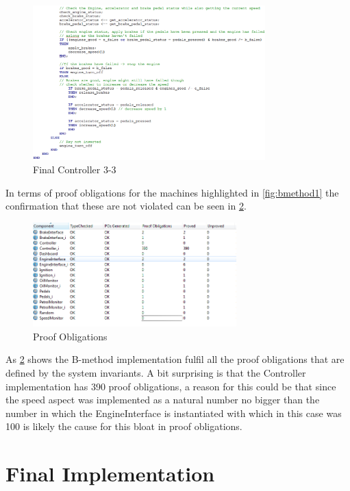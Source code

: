 \documentclass[12pt]{article}
\begin{document}
\begin{figure}[H]
	\centering
	\includegraphics[width=0.8\textwidth]{new_controller_v3}
	\caption{Final Controller 3-3}
	\label{fig:bmethod12}
\end{figure}

In terms of proof obligations for the machines highlighted in \ref{fig:bmethod1} the confirmation that these are not violated can be seen in \ref{fig:bmethod13}.

\begin{figure}
	\centering
	\includegraphics[width=0.7\textwidth]{proof_obligations_v2}
	\caption{Proof Obligations}
	\label{fig:bmethod13}
\end{figure}

As \ref{fig:bmethod13} shows the B-method implementation fulfil all the proof obligations that are defined by the system invariants. A bit surprising is that the Controller implementation has 390 proof obligations, a reason for this could be that since the speed aspect was implemented as a natural number no bigger than the number in which the EngineInterface is instantiated with which in this case was 100 is likely the cause for this bloat in proof obligations.

\section{Final Implementation}
\end{document}
